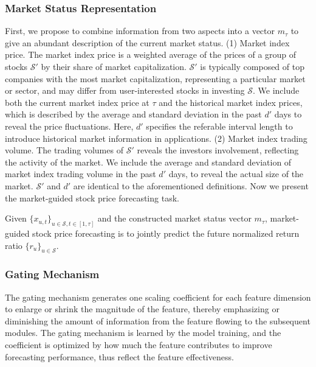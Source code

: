 \subsubsection{Market Status Representation}
First, we propose to combine information from two aspects into a vector $m_\tau$ to give an abundant description of the current market status.
(1) Market index price.
The market index price is a weighted average of the prices of a group of stocks $\mathcal{S'}$ by their share of market capitalization. 
$\mathcal{S'}$ is typically composed of top companies with the most market capitalization, representing a particular market or sector, and may differ from user-interested stocks in investing $\mathcal{S}$.
We include both the current market index price at $\tau$ and the historical market index prices, which is described by the average and standard deviation in the past $d'$ days to reveal the price fluctuations. Here, $d'$ specifies the referable interval length to introduce historical market information in applications. 
(2) Market index trading volume. The trading volumes of $\mathcal{S'}$ reveals the investors involvement, reflecting the activity of the market. We include the average and standard deviation of market index trading volume in the past $d'$ days, to reveal the actual size of the market. $\mathcal{S'}$ and $d'$ are identical to the aforementioned definitions.
Now we present the market-guided stock price forecasting task.

\begin{definition}
Given $\{x_{u,t}\}_{u\in \mathcal{S},t\in [1, \tau]}$ and the constructed market status vector $m_\tau$,  market-guided stock price forecasting is to jointly predict the future normalized return ratio $\{r_u\}_{u\in \mathcal{S}}$.
\end{definition}

\subsubsection{Gating Mechanism}
The gating mechanism generates one scaling coefficient for each feature dimension to enlarge or shrink the magnitude of the feature, thereby emphasizing or diminishing the amount of information from the feature flowing to the subsequent modules. 
The gating mechanism is learned by the model training, and the coefficient is optimized by how much the feature contributes to improve forecasting performance, thus reflect the feature effectiveness. 

